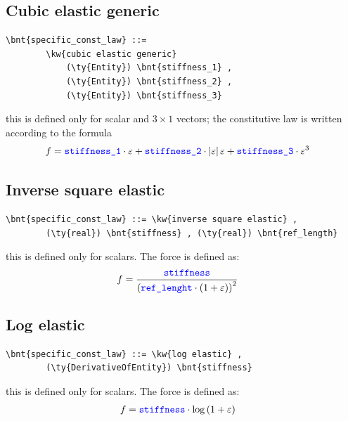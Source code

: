 \subsection{Cubic elastic generic}
\begin{Verbatim}[commandchars=\\\{\}]
    \bnt{specific_const_law} ::= 
        \kw{cubic elastic generic}
            (\ty{Entity}) \bnt{stiffness_1} ,
            (\ty{Entity}) \bnt{stiffness_2} ,
            (\ty{Entity}) \bnt{stiffness_3}
\end{Verbatim}
this is defined only for scalar and $3 \times 1$ vectors; the constitutive
law is written according to the formula
\begin{align}
	f
	&=
	\textcolor{blue}{\texttt{stiffness\_1}} \cdot \varepsilon
	+ \textcolor{blue}{\texttt{stiffness\_2}} \cdot \left| \varepsilon \right|\varepsilon
	+ \textcolor{blue}{\texttt{stiffness\_3}} \cdot \varepsilon^3
\end{align}
%

\subsection{Inverse square elastic}
\begin{Verbatim}[commandchars=\\\{\}]
    \bnt{specific_const_law} ::= \kw{inverse square elastic} ,
        (\ty{real}) \bnt{stiffness} , (\ty{real}) \bnt{ref_length}
\end{Verbatim}
this is defined only for scalars. The force is defined as:
\begin{align}
    f &= \frac{\textcolor{blue}{\texttt{stiffness}}}{\left( \textcolor{blue}{\texttt{ref\_lenght}} \cdot \left( 1 + \varepsilon \right) \right)^2}
\end{align}
  
\subsection{Log elastic}
\begin{Verbatim}[commandchars=\\\{\}]
    \bnt{specific_const_law} ::= \kw{log elastic} ,
        (\ty{DerivativeOfEntity}) \bnt{stiffness}
\end{Verbatim}
this is defined only for scalars. The force is defined as:
\begin{align}
    f &= \textcolor{blue}{\texttt{stiffness}} \cdot \mathrm{log}\left( 1 + \varepsilon \right)
\end{align}
  
